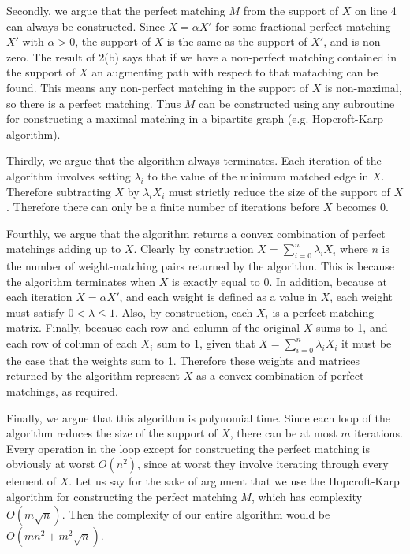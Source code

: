 \documentclass{hmcpset}
\begin{document}
\begin{solution}
\begin{enumerate}
Secondly, we argue that the perfect matching $M$ from the support of $X$
on line 4 can always be constructed. Since $X = \alpha X'$
for some fractional perfect matching $X'$ with $\alpha > 0$, the support
of $X$ is the same as the support of $X'$, and is non-zero.
The result of 2(b) says that if we have a non-perfect
matching contained in the support of $X$ an augmenting path with respect to
that mataching can be found. This means any non-perfect matching in the support
of $X$ is non-maximal, so there is a perfect matching. Thus $M$ can be constructed
using any subroutine for constructing a maximal matching in a bipartite graph
(e.g. Hopcroft-Karp algorithm).

Thirdly, we argue that the algorithm always terminates. Each iteration of the
algorithm involves setting $\lambda_i$ to the value of the minimum matched
edge in $X$. Therefore subtracting $X$ by $\lambda_i X_i$ must strictly reduce
the size of the support of $X$. Therefore there can only be a finite number
of iterations before $X$ becomes 0.

Fourthly, we argue that the algorithm returns a convex combination of perfect
matchings adding up to $X$. Clearly by construction $X = \sum_{i = 0}^n{\lambda_i X_i}$
where $n$ is the number of weight-matching pairs returned by the algorithm.
This is because the algorithm terminates when $X$ is exactly equal to 0.
In addition, because at each iteration $X = \alpha X'$, and each weight is
defined as a value in $X$, each weight must satisfy $0 < \lambda \leq 1$.
Also, by construction, each $X_i$ is a perfect matching matrix.
Finally, because each row and column of the original $X$ sums to 1,
and each row of column of each $X_i$ sum to 1, given that
$X = \sum_{i = 0}^n{\lambda_i X_i}$ it must be the case that the weights
sum to 1. Therefore these weights and matrices returned by the algorithm
represent $X$ as a convex combination of perfect matchings, as required.

Finally, we argue that this algorithm is polynomial time. Since each loop
of the algorithm reduces the size of the support of $X$, there can be at
most $m$ iterations. Every operation in the loop except for constructing
the perfect matching is obviously at worst $O(n^2)$, since at worst they
involve iterating through every element of $X$. Let us say for the sake of
argument that we use the Hopcroft-Karp algorithm for constructing the
perfect matching $M$, which has complexity $O(m\sqrt{n})$. Then the
complexity of our entire algorithm would be $O(mn^2 + m^2\sqrt{n})$.





\end{enumerate}
\end{solution}
\end{document}
